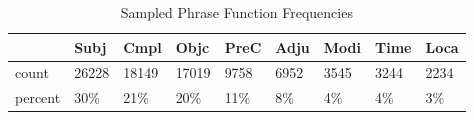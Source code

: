 \begin{table}[htbp!]
\centering
\caption{Sampled Phrase Function Frequencies}
\label{table:funct_counts}
\begin{tabular}{lllllllll}
\toprule
{} &   Subj &   Cmpl &   Objc &  PreC &  Adju &  Modi &  Time &  Loca \\
\midrule
count   &  26228 &  18149 &  17019 &  9758 &  6952 &  3545 &  3244 &  2234 \\
percent &    30\% &    21\% &    20\% &   11\% &    8\% &    4\% &    4\% &    3\% \\
\bottomrule
\end{tabular}
\end{table}
